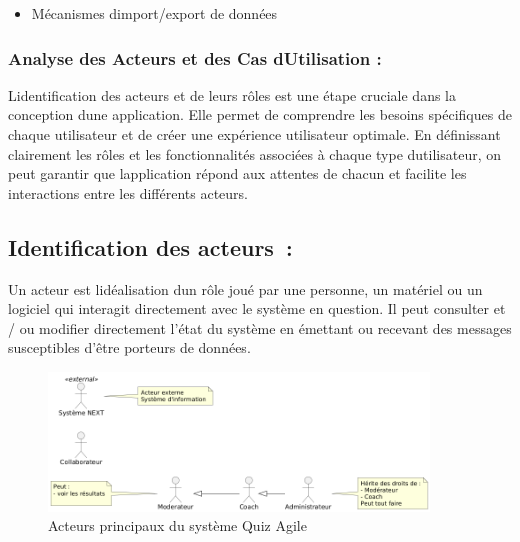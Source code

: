 \documentclass[12pt,a4paper,twoside]{report}
\begin{document}
\begin{itemize}
\item
  Mécanismes
  d\textquotesingle import/export de données
\end{itemize}

\hypertarget{analyse-des-acteurs-et-des-cas-dutilisation}{%
\subsubsection{Analyse des Acteurs et des Cas
d\textquotesingle Utilisation
:}\label{analyse-des-acteurs-et-des-cas-dutilisation}}

L\textquotesingle identification des acteurs et de leurs rôles est une
étape cruciale dans la conception d\textquotesingle une application.
Elle permet de comprendre les besoins spécifiques de chaque utilisateur
et de créer une expérience utilisateur optimale. En définissant
clairement les rôles et les fonctionnalités associées à chaque type
d\textquotesingle utilisateur, on peut garantir que
l\textquotesingle application répond aux attentes de chacun et facilite
les interactions entre les différents acteurs.

\hypertarget{identification-des-acteurs}{%
\subsection{Identification des
acteurs~:}\label{identification-des-acteurs}}

Un acteur est l\textquotesingle idéalisation d\textquotesingle un rôle
joué par une personne, un matériel ou un logiciel qui interagit
directement avec le système en question. Il peut consulter et / ou
modifier directement l'état du système en émettant ou recevant des
messages susceptibles d'être porteurs de données.

\begin{figure}[H]
\centering
\includegraphics[width=0.9\textwidth]{latex_media/media/image13.png}
\caption{Acteurs principaux du système Quiz Agile}
\label{fig:acteurs-principaux}
\end{figure}
\end{document}
